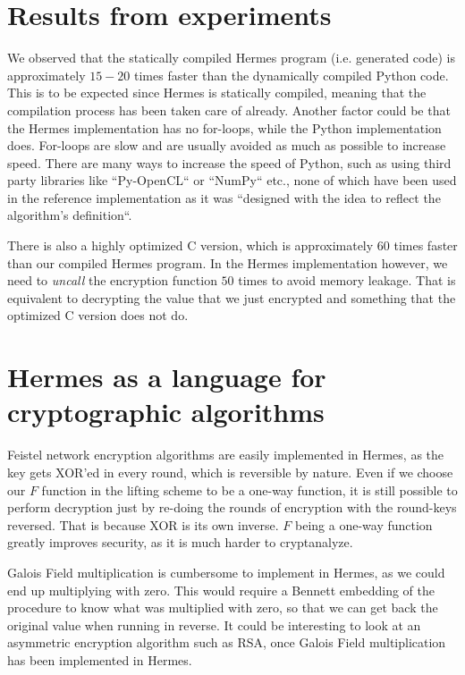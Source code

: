 \section{Results from experiments}
We observed that the statically compiled Hermes program (i.e. generated code) is approximately $15-20$ times faster than the dynamically compiled Python code.
This is to be expected since Hermes is statically compiled, meaning that the compilation process has been taken care of already.
Another factor could be that the Hermes implementation has no for-loops, while the Python implementation does.
For-loops are slow and are usually avoided as much as possible to increase speed.
There are many ways to increase the speed of Python, such as using third party libraries like ``Py-OpenCL`` or ``NumPy`` etc., none of which have been used in the reference implementation as it was ``designed with the idea to reflect the algorithm's definition``\cite{GIT2F}.

There is also a highly optimized C version\cite{GIT2F}, which is approximately $60$ times faster than our compiled Hermes program.
In the Hermes implementation however, we need to \emph{uncall} the encryption function $50$ times to avoid memory leakage.
That is equivalent to decrypting the value that we just encrypted and something that the optimized C version does not do.

\section{Hermes as a language for cryptographic algorithms}
Feistel network encryption algorithms are easily implemented in Hermes, as the key gets XOR'ed in every round, which is reversible by nature.
Even if we choose our $F$ function in the lifting scheme to be a one-way function, it is still possible to perform decryption just by re-doing the rounds of encryption with the round-keys reversed. That is because XOR is its own inverse. $F$ being a one-way function greatly improves security, as it is much harder to cryptanalyze.

Galois Field multiplication is cumbersome to implement in Hermes, as we could end up multiplying with zero. This would require a Bennett embedding of the procedure to know what was multiplied with zero, so that we can get back the original value when running in reverse. It could be interesting to look at an asymmetric encryption algorithm such as RSA, once Galois Field multiplication has been implemented in Hermes.

